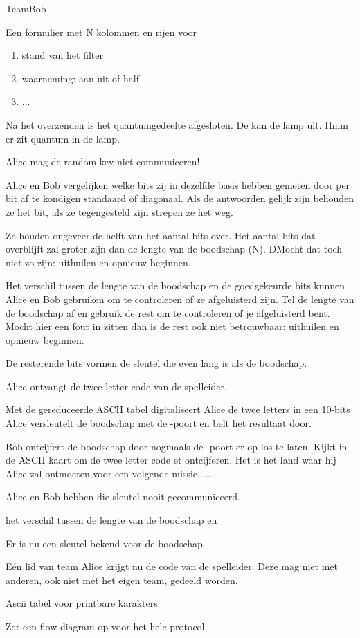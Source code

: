 \documentclass[../main.tex]{subfiles}
\begin{document}
TeamBob

Een formulier met N kolommen en rijen voor 

\begin{enumerate}
\item stand van het filter
\item waarneming: aan uit of half
\item ...
\end{enumerate}

Na het overzenden is het quantumgedeelte afgesloten. De kan de lamp uit. Hmm er zit quantum in de lamp.

Alice mag de random key niet communiceren!

Alice en Bob vergelijken welke bits zij in dezelfde basis hebben gemeten door per bit af te kondigen standaard of diagonaal. Als de antwoorden gelijk zijn behouden ze het bit, als ze tegengesteld zijn strepen ze het weg.

Ze houden ongeveer de helft van het aantal bits over. Het aantal bits dat overblijft zal groter zijn dan de lengte van de boodschap (N). DMocht dat toch niet zo zijn: uithuilen en opnieuw beginnen.

Het verschil tussen de lengte van de boodschap en de goedgekeurde bits kunnen Alice en Bob gebruiken om te controleren of ze afgeluisterd zijn. Tel de lengte van de boodschap af en gebruik de rest om te controleren of je afgeluisterd bent.
Mocht hier een fout in zitten dan is de rest ook niet betrouwbaar: uithuilen en opnieuw beginnen.

De resterende bits vormen de sleutel die even lang is als de boodschap.

Alice ontvangt de twee letter code van de spelleider.

Met de gereduceerde ASCII tabel digitaliseert Alice de twee letters in een 10-bits 
Alice versleutelt de boodschap met de -poort en belt het resultaat door.

Bob ontcijfert de boodschap door nogmaals de -poort er op los te laten.
Kijkt in de ASCII kaart om de twee letter code et ontcijferen. Het is het land waar hij Alice zal ontmoeten voor een volgende missie.....


Alice en Bob hebben die sleutel nooit gecommuniceerd.


het verschil tussen de lengte van de boodschap en 


Er is nu een sleutel bekend voor de boodschap.

E\'en lid van team Alice krijgt nu de code van de spelleider. Deze mag niet met anderen, ook niet met het eigen team, gedeeld worden.
 

 
Ascii tabel voor printbare karakters
 

Zet een flow diagram op voor het hele protocol.
\end{document}
